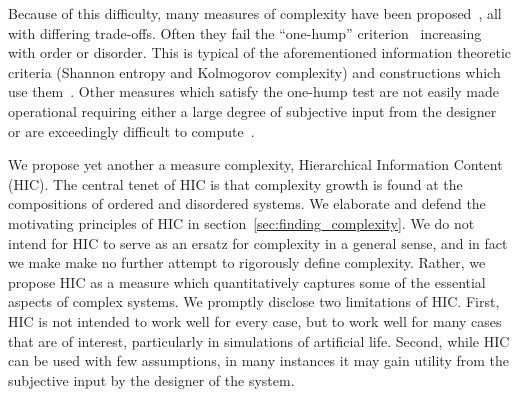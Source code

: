 Because of this difficulty, many measures of complexity have been
proposed~\citep{lloyd2001measures}, all with differing trade-offs. Often they
fail the ``one-hump'' criterion~\citep{adami2002complexity} increasing with
order or disorder. This is typical of the aforementioned information theoretic
criteria (Shannon entropy and Kolmogorov complexity) and constructions which
use them~\citep{lloyd1988complexity}. Other measures which satisfy the one-hump
test are not easily made operational requiring either a large degree of
subjective input from the designer or are exceedingly difficult to
compute~\citep{crutchfield1989inferring, gell1996information,
grassberger1986toward}.

We propose yet another a measure complexity, Hierarchical Information Content
(HIC). The central tenet of HIC is that complexity growth is found at the
compositions of ordered and disordered systems. We elaborate and defend the
motivating principles of HIC in section~\ref{sec:finding_complexity}. We do not
intend for HIC to serve as an ersatz for complexity in a general sense, and in
fact we make make no further attempt to rigorously define complexity. Rather,
we propose HIC as a measure which quantitatively captures some of the essential
aspects of complex systems. We promptly disclose two limitations of HIC. First,
HIC is not intended to work well for every case, but to work well for many
cases that are of interest, particularly in simulations of artificial life.
Second, while HIC can be used with few assumptions, in many instances it may
gain utility from the subjective input by the designer of the system.

